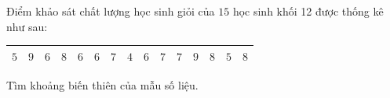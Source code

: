\begin{ex}
Điểm khảo sát chất lượng học sinh giỏi của $15$ học sinh khối 12 được thống kê như sau:
\begin{center}
\begin{tabular}{|c|c|c|c|c|c|c|c|c|c|c|c|c|c|c|}\hline
$5$ & $9$ & $6$ & $8$ & $6$ & $6$ & $7$ & $4$ & $6$ & $7$ & $7$ & $9$ & $8$ & $5$ & $8$\\\hline
\end{tabular}
\end{center}
Tìm khoảng biến thiên của mẫu số liệu.
\end{ex}
